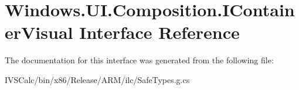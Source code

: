 \hypertarget{interface_windows_1_1_u_i_1_1_composition_1_1_i_container_visual}{}\section{Windows.\+U\+I.\+Composition.\+I\+Container\+Visual Interface Reference}
\label{interface_windows_1_1_u_i_1_1_composition_1_1_i_container_visual}


The documentation for this interface was generated from the following file\+:\begin{DoxyCompactItemize}
\item 
I\+V\+S\+Calc/bin/x86/\+Release/\+A\+R\+M/ilc/Safe\+Types.\+g.\+cs\end{DoxyCompactItemize}
